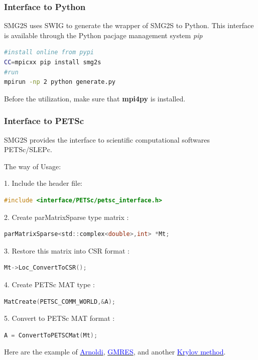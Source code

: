 \subsubsection{Interface to Python}

SMG2S uses SWIG to generate the wrapper of SMG2S to Python. This interface is available through the Python pacjage management system \textit{pip}

\begin{lstlisting}[language=bash,frame=single]
#install online from pypi
CC=mpicxx pip install smg2s
#run
mpirun -np 2 python generate.py
\end{lstlisting}

Before the utilization, make sure that \textbf{mpi4py} is installed.

\subsubsection{Interface to PETSc}

SMG2S provides the interface to scientific computational softwares PETSc/SLEPc.

The way of Usage:

1. Include the header file:
\begin{lstlisting}[language=C,frame=single]
#include <interface/PETSc/petsc_interface.h>
\end{lstlisting}

2. Create parMatrixSparse type matrix :
\begin{lstlisting}[language=C,frame=single]
parMatrixSparse<std::complex<double>,int> *Mt;
\end{lstlisting}

3. Restore this matrix into CSR format :
\begin{lstlisting}[language=C,frame=single]
Mt->Loc_ConvertToCSR();
\end{lstlisting}

4. Create PETSc MAT type :
\begin{lstlisting}[language=C,frame=single]
MatCreate(PETSC_COMM_WORLD,&A); 
\end{lstlisting}

5. Convert to PETSc MAT format :

\begin{lstlisting}[language=C,frame=single]
A = ConvertToPETSCMat(Mt); 
\end{lstlisting}

Here are the example of \href{https://github.com/SMG2S/SMG2S/tree/master/example/arnoldi}{\textcolor{blue}{Arnoldi}}, \href{https://github.com/SMG2S/SMG2S/tree/master/example/gmres}{\textcolor{blue}{GMRES}}, and another  \href{https://github.com/SMG2S/SMG2S/tree/master/example/krylov}{\textcolor{blue}{Krylov method}}.

